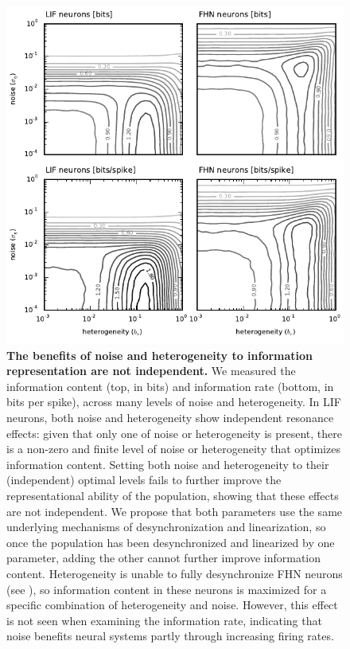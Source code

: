 \documentclass[12pt]{article}
\begin{document}
\begin{figure}
  \ifx\hidefigures\undefined
    \centering
    \includegraphics[width=\textwidth]{figure3_infocontour.pdf}
  \fi
  \caption{
    \textbf{The benefits of noise and heterogeneity to information representation are not independent.}
We measured the information content (top, in bits) and information rate (bottom, in bits per spike),
across many levels of noise and heterogeneity.
In LIF neurons, both noise and heterogeneity show independent resonance effects:
given that only one of noise or heterogeneity is present,
there is a non-zero and finite level of noise or heterogeneity that optimizes information content.
Setting both noise and heterogeneity to their (independent) optimal levels
fails to further improve the representational ability of the population,
showing that these effects are not independent.
We propose that both parameters use
the same underlying mechanisms of desynchronization and linearization,
so once the population has been desynchronized and linearized by one parameter,
adding the other cannot further improve information content.
Heterogeneity is unable to fully desynchronize FHN neurons (see \textsc{}),
so information content in these neurons is maximized for a specific combination of heterogeneity and noise. However, this effect is not seen when examining the information rate,
indicating that noise benefits neural systems partly through increasing firing rates.
  }
  \label{fig:infocontour}
\end{figure}
\end{document}
